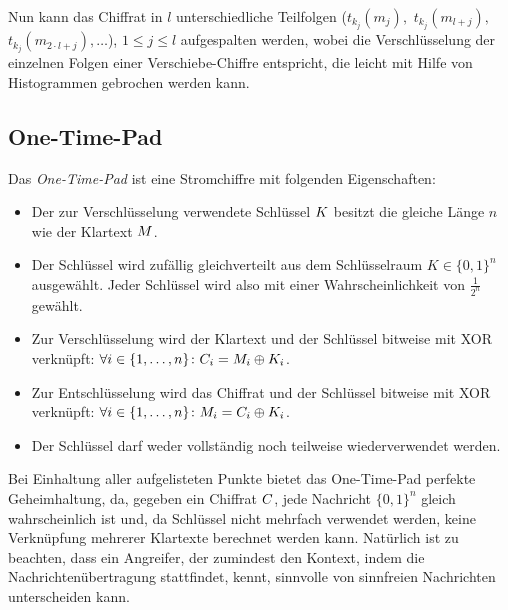 Nun kann das Chiffrat in $l$ unterschiedliche Teilfolgen ($t_{k_j}(m_j),$ $t_{k_j}(m_{l+j}),$ $t_{k_j}(m_{2 \cdot l+j}),\ldots$), $1 \leq j \leq l$ aufgespalten werden, wobei die Verschlüsselung der einzelnen Folgen einer Verschiebe-Chiffre entspricht, die leicht mit Hilfe von Histogrammen gebrochen werden kann.

\subsection{One-Time-Pad}
\label{ssec:otp}
Das \emph{One-Time-Pad} ist eine Stromchiffre mit folgenden Eigenschaften:
\begin{itemize}
	\item Der zur Verschlüsselung verwendete Schlüssel $K$ besitzt die gleiche Länge $n$ wie der Klartext $M$.
	\item Der Schlüssel wird zufällig gleichverteilt aus dem Schlüsselraum $K \in \{0,1\}^{n}$ ausgewählt. Jeder Schlüssel wird also mit einer Wahrscheinlichkeit von $\frac{1}{2^{n}}$ gewählt.
 	\item Zur Verschlüsselung wird der Klartext und der Schlüssel bitweise mit XOR verknüpft: $\forall i \in \{1,\dots,n\}\colon C_i = M_i\oplus K_i$.
 	\item Zur Entschlüsselung wird das Chiffrat und der Schlüssel bitweise mit XOR verknüpft: $\forall i \in \{1,\dots,n\}\colon M_i = C_i\oplus K_i$.
  	\item Der Schlüssel darf weder vollständig noch teilweise wiederverwendet werden.
\end{itemize}
Bei Einhaltung aller aufgelisteten Punkte bietet das One-Time-Pad perfekte Geheimhaltung, da, gegeben ein Chiffrat $C$, jede Nachricht $\{0,1\}^{n}$ gleich wahrscheinlich ist und, da Schlüssel nicht mehrfach verwendet werden, keine Verknüpfung mehrerer Klartexte berechnet werden kann. Natürlich ist zu beachten, dass ein Angreifer, der zumindest den Kontext, indem die Nachrichtenübertragung stattfindet, kennt, sinnvolle von sinnfreien Nachrichten unterscheiden kann.

